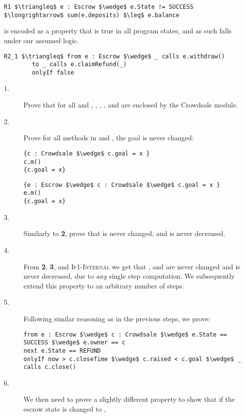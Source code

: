 \documentclass[acmsmall,review,anonymous]{acmart}\settopmatter{printfolios=true,printccs=false,printacmref=false}
\begin{document}
\begin{lstlisting}[language = Chainmail, mathescape=true, frame=lines]
R1 $\triangleq$ e : Escrow $\wedge$ e.State != SUCCESS $\longrightarrow$ sum(e.deposits) $\leq$ e.balance
\end{lstlisting}
 is encoded as a property that is true in all program states, and 
as such falls under our assumed logic.

\begin{lstlisting}[language = Chainmail, mathescape=true, frame=lines]
R2_1 $\triangleq$ from e : Escrow $\wedge$ _ calls e.withdraw()
        to _ calls e.claimRefund(_)
        onlyIf false
\end{lstlisting}
\begin{description}
\item[1.] Prove that for all  and , , , , and  are enclosed by the Crowdsale module.
\item[2.] Prove for all methods  in  and , the goal is never changed:
\begin{lstlisting}[language = Chainmail, mathescape=true, frame=lines]
{c : Crowdsale $\wedge$ c.goal = x }
c.m()
{c.goal = x}
\end{lstlisting}
\begin{lstlisting}[language = Chainmail, mathescape=true, frame=lines]
{e : Escrow $\wedge$ c : Crowdsale $\wedge$ c.goal = x }
e.m()
{c.goal = x}
\end{lstlisting}
\item[3.] Similarly to \textbf{2}, prove that  is never changed, and  is never decreased.
\item[4.] From \textbf{2}, \textbf{3}, and \textsc{If1-Internal} we get that , and  are never changed 
and  is never decreased, due to \emph{any} single step computation. We subsequently extend this property to an arbitrary number of steps.
\item[5.] Following similar reasoning as in the previous steps, we prove:
\begin{lstlisting}[language=Chainmail, mathescape=true, frame=lines]
from e : Escrow $\wedge$ c : Crowdsale $\wedge$ e.State == SUCCESS $\wedge$ e.owner == c
next e.State == REFUND
onlyIf now > c.closeTime $\wedge$ c.raised < c.goal $\wedge$ _ calls c.close()
\end{lstlisting}
\item[6.] We then need to prove a slightly different property to show that if the escrow state is changed to ,

\end{description}
\end{document}

